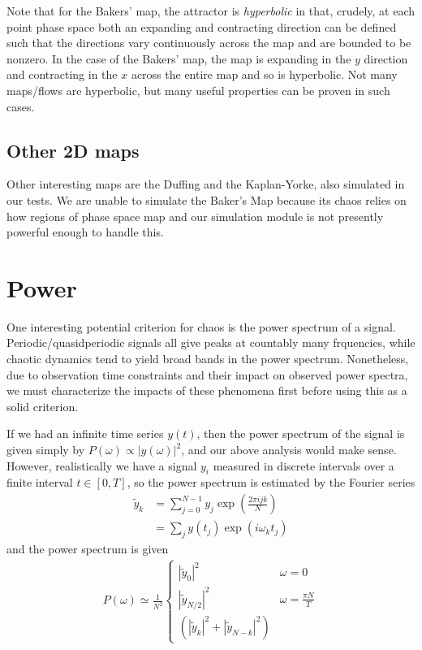 \documentclass[12pt]{article}
\newcommand{\abs}[1]{\left|#1\right|}
\begin{document}
Note that for the Bakers' map, the attractor is \emph{hyperbolic} in that,
crudely, at each point phase space both an expanding and contracting direction
can be defined such that the directions vary continuously across the map and are
bounded to be nonzero. In the case of the Bakers' map, the map is expanding in
the $y$ direction and contracting in the $x$ across the entire map and so is
hyperbolic. Not many maps/flows are hyperbolic, but many useful properties can
be proven in such cases.

\subsection{Other 2D maps}

Other interesting maps are the Duffing and the Kaplan-Yorke, also simulated in
our tests. We are unable to simulate the Baker's Map because its chaos relies on
how regions of phase space map and our simulation module is not presently
powerful enough to handle this.

\clearpage

\section{Power}

One interesting potential criterion for chaos is the power spectrum of a signal.
Periodic/quasidperiodic signals all give peaks at countably many frquencies,
while chaotic dynamics tend to yield broad bands in the power spectrum.
Nonetheless, due to observation time constraints and their impact on observed
power spectra, we must characterize the impacts of these phenomena first before
using this as a solid criterion.

If we had an infinite time series $y(t)$, then the power spectrum of the signal
is given simply by $P(\omega) \propto \abs{y(\omega)}^2$, and our above
analysis would make sense. However, realistically we have a signal $y_i$
measured in discrete intervals over a finite interval $t \in [0,T]$, so the
power spectrum is estimated by the Fourier series
\begin{align}
    \tilde{y}_k &= \sum\limits_{j=0}^{N-1}y_j \exp \left( \frac{2\pi ijk}{N}
    \right)\\
    &= \sum\limits_{j}^{}y(t_j) \exp \left( i \omega_k t_j \right)
\end{align}
and the power spectrum is given
\begin{align}
    P(\omega) \simeq
    \frac{1}{N^2}
    \begin{cases}
        \abs{\tilde{y}_0}^2 & \omega = 0\\
        \abs{\tilde{y}_{N/2}}^2 & \omega = \frac{\pi N}{T}\\
        \left( \abs{\tilde{y}_k}^2 + \abs{\tilde{y}_{N-k}}^2 \right)
    \end{cases}
\end{align}
\end{document}
